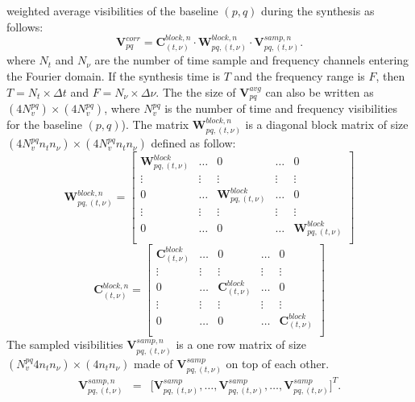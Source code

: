 \documentclass[useAMS,usenatbib]{mn2e}
\begin{document}
weighted average visibilities of the  baseline $(p,q)$ during the synthesis as follows: 
\begin{equation}
\mathbf{V}_{pq}^{corr}=\mathbf{C}_{(t,\nu)}^{block,n}\cdot\mathbf{W}_{pq,(t,\nu)}^{block,n}\cdot \mathbf{V}_{pq,(t,\nu)}^{samp,n}.
\end{equation}
where $N_t$ and  $N_{\nu}$ are the number of time sample and frequency channels entering the Fourier domain. If the synthesis time is $T$ 
and the frequency range is $F$, then $T=N_t \times \Delta t$ and $F=N_{\nu}\times\Delta \nu$. The the size of 
$\mathbf{V}_{pq}^{avg}$ can also be written as $(4N_v^{pq})\times (4N_v^{pq})$, where $N_v^{pq}$ is the 
number of time and frequency visibilities for the baseline $(p,q)$). The matrix $\mathbf{W}_{pq,(t,\nu)}^{block,n}$ is a diagonal block 
matrix of size $(4N_v^{pq}n_t n_{\nu})\times (4N_v^{pq}n_t n_{\nu})$ defined as follow:
\begin{equation*}
\mathbf{W}_{pq,(t,\nu)}^{block,n}=
  \begin{bmatrix}
    \mathbf{W}_{pq,(t,\nu)}^{block} &\dots & 0 & \dots & 0\\
    \vdots & \vdots & \vdots & \vdots & \vdots\\
    0 & \dots& \mathbf{W}_{pq,(t,\nu)}^{block} &\dots & 0\\
    \vdots & \vdots & \vdots & \vdots & \vdots \\
    0 & \dots& 0 &\dots & \mathbf{W}_{pq,(t,\nu)}^{block}\\
  \end{bmatrix}
\end{equation*}
\begin{equation*}
\mathbf{C}_{(t,\nu)}^{block,n}=
  \begin{bmatrix}
    \mathbf{C}_{(t,\nu)}^{block} &\dots & 0 & \dots & 0\\
    \vdots & \vdots & \vdots & \vdots & \vdots\\
    0 & \dots& \mathbf{C}_{(t,\nu)}^{block} &\dots & 0\\
    \vdots & \vdots & \vdots & \vdots & \vdots \\
    0 & \dots& 0 &\dots & \mathbf{C}_{(t,\nu)}^{block}\\
  \end{bmatrix}
\end{equation*}
The sampled visibilities $\mathbf{V}_{pq,(t,\nu)}^{samp,n}$ is a one row matrix of size 
$(N_v^{pq}4 n_t n_{\nu})\times (4 n_t n_{\nu})$ made of $\textbf{V}_{pq,(t,\nu)}^{samp}$ on top of each other. 
\begin{eqnarray*}
\mathbf{V}_{pq,(t,\nu)}^{samp,n}&=&\Bigg[\mathbf{V}_{pq,(t,\nu)}^{samp},\dots, \mathbf{V}_{pq,(t,\nu)}^{samp}, \dots,
\mathbf{V}_{pq,(t,\nu)}^{samp}\Bigg]^T. 
\end{eqnarray*}
\end{document}
